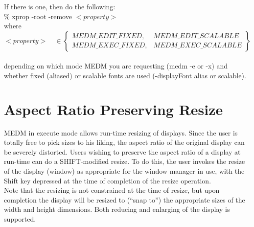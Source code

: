 \noindent If there is one, then do the following:\\

\% xprop -root -remove $<property>$\\

\noindent where \[ <property>  \hspace{12pt} \in \left\{ \begin{array}{ll}
		MEDM\_EDIT\_FIXED, & MEDM\_EDIT\_SCALABLE\\
		MEDM\_EXEC\_FIXED, & MEDM\_EXEC\_SCALABLE\end{array} \right\}
\] \\

\noindent depending on which mode MEDM you are requesting (medm -e or -x)
and whether fixed (aliased) or scalable fonts are used (-displayFont alias
or scalable).\\


\section{Aspect Ratio Preserving Resize}

MEDM in execute mode allows run-time resizing of displays.  Since the user
is totally free to pick sizes to his liking, the aspect ratio of the
original display can be severely distorted.  Users wishing to preserve
the aspect ratio of a display at run-time can do a SHIFT-modified resize.
To do this, the user invokes the resize of the display (window) as appropriate
for the window manager in use, with the Shift key depressed at the time of
completion of the resize operation.\\

\noindent Note that the resizing is not constrained at the time of resize, but
upon completion the display will be resized to (``snap to'') the appropriate
sizes of the width and height dimensions.  Both reducing and enlarging of
the display is supported.\\





